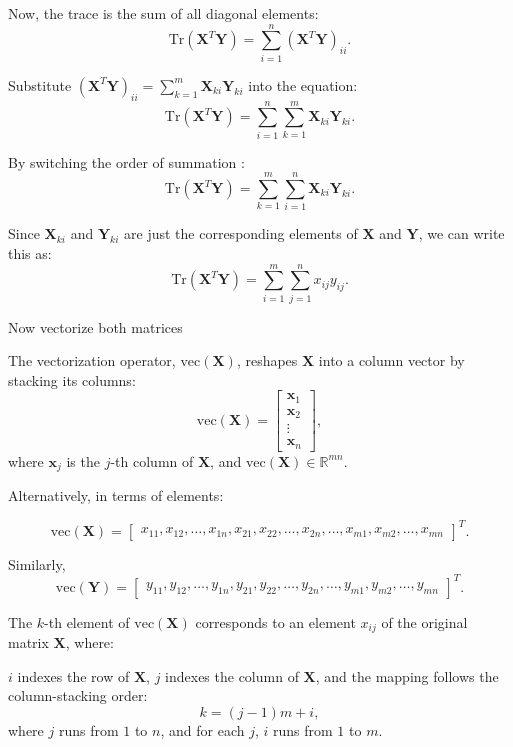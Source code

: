 \documentclass[12pt]{article}
\begin{document}
Now, the trace is the sum of all diagonal elements:
\[
\text{Tr}(\mathbf{X}^T \mathbf{Y}) = \sum_{i=1}^n (\mathbf{X}^T \mathbf{Y})_{ii}.
\]


Substitute \( (\mathbf{X}^T \mathbf{Y})_{ii} = \sum_{k=1}^m \mathbf{X}_{ki} \mathbf{Y}_{ki} \) into the equation:
\[
\text{Tr}(\mathbf{X}^T \mathbf{Y}) = \sum_{i=1}^n \sum_{k=1}^m \mathbf{X}_{ki} \mathbf{Y}_{ki}.
\]


By switching the order of summation :
\[
\text{Tr}(\mathbf{X}^T \mathbf{Y}) = \sum_{k=1}^m \sum_{i=1}^n \mathbf{X}_{ki} \mathbf{Y}_{ki}.
\]

Since \( \mathbf{X}_{ki} \) and \( \mathbf{Y}_{ki} \) are just the corresponding elements of \( \mathbf{X} \) and \( \mathbf{Y} \), we can write this as:
\[
\text{Tr}(\mathbf{X}^T \mathbf{Y}) = \sum_{i=1}^m \sum_{j=1}^n x_{ij} y_{ij}.
\]


Now vectorize both matrices

The vectorization operator, \( \text{vec}(\mathbf{X}) \), reshapes \( \mathbf{X} \) into a column vector by stacking its columns:
\[
\text{vec}(\mathbf{X}) = \begin{bmatrix} \mathbf{x}_1 \\ \mathbf{x}_2 \\ \vdots \\ \mathbf{x}_n \end{bmatrix},
\]
where \( \mathbf{x}_j \) is the \( j \)-th column of \( \mathbf{X} \), and \( \text{vec}(\mathbf{X}) \in \mathbb{R}^{mn} \).

Alternatively, in terms of elements:

\[
\text{vec}(\mathbf{X}) = \begin{bmatrix} x_{11},x_{12}, \dots , x_{1n} ,x_{21} , x_{22} ,\dots , x_{2n} ,\dots , x_{m1} , x_{m2} , \dots , x_{mn} \end{bmatrix}^T.
\] 


Similarly,
\[
\text{vec}(\mathbf{Y}) = \begin{bmatrix} y_{11} , y_{12} ,\dots , y_{1n} , y_{21} , y_{22} , \dots , y_{2n} , \dots , y_{m1} , y_{m2} , \dots , y_{mn} \end{bmatrix}^T.
\] 


The \( k \)-th element of \( \text{vec}(\mathbf{X}) \) corresponds to an element \( x_{ij} \) of the original matrix \( \mathbf{X} \), where:

\( i \) indexes the row of \( \mathbf{X} \), \( j \) indexes the column of \( \mathbf{X} \),
and the mapping follows the column-stacking order:
\[
k = (j-1)m + i,
\]
where \( j \) runs from \( 1 \) to \( n \), and for each \( j \), \( i \) runs from \( 1 \) to \( m \).
\vspace{\baselineskip}
\end{document}

